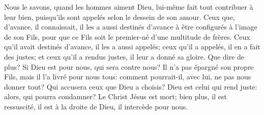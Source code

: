 Nous le savons, quand les hommes aiment Dieu,
	lui-même fait tout contribuer à leur bien,
	puisqu’ils sont appelés selon le dessein de son amour.
Ceux que, d’avance, il connaissait,
	il les a aussi destinés d’avance à être configurés à l’image de son Fils,
	pour que ce Fils soit le premier-né d’une multitude de frères.
Ceux qu’il avait destinés d’avance, il les a aussi appelés;
	ceux qu’il a appelés, il en a fait des justes;
	et ceux qu’il a rendus justes, il leur a donné sa gloire.
Que dire de plus? Si Dieu est pour nous, qui sera contre nous?
Il n’a pas épargné son propre Fils, mais il l’a livré pour nous tous:
	comment pourrait-il, avec lui, ne pas nous donner tout?
Qui accusera ceux que Dieu a choisis?
Dieu est celui qui rend juste: alors, qui pourra condamner?
Le Christ Jésus est mort;
	bien plus, il est ressuscité, il est à la droite de Dieu, il intercède pour nous.
